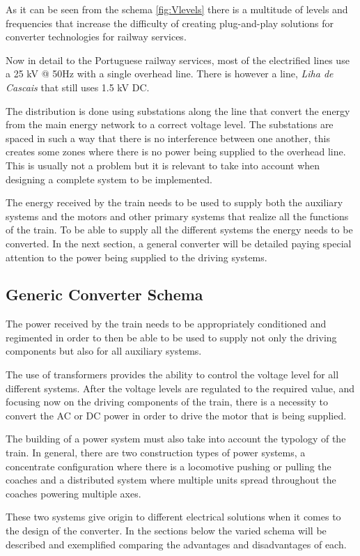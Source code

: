 As it can be seen from the schema \ref{fig:Vlevels} there is a multitude of levels and frequencies that increase the difficulty of creating plug-and-play solutions for converter technologies for railway services.

Now in detail to the Portuguese railway services, most of the electrified lines use a 25 kV @ 50Hz with a single overhead line. There is however a line, \textit{Liha de Cascais} that still uses 1.5 kV DC. 

The distribution is done using substations along the line that convert the energy from the main energy network to a correct voltage level. The substations are spaced in such a way that there is no interference between one another, this creates some zones where there is no power being supplied to the overhead line. This is usually not a problem but it is relevant to take into account when designing a complete system to be implemented.

The energy received by the train needs to be used to supply both the auxiliary systems and the motors and other primary systems that realize all the functions of the train. To be able to supply all the different systems the energy needs to be converted. In the next section, a general converter will be detailed paying special attention to the power being supplied to the driving systems.

\subsection{Generic Converter Schema}
The power received by the train needs to be appropriately conditioned and regimented in order to then be able to be used to supply not only the driving components but also for all auxiliary systems.

The use of transformers provides the ability to control the voltage level for all different systems. After the voltage levels are regulated to the required value, and focusing now on the driving components of the train, there is a necessity to convert the AC or DC power in order to drive the motor that is being supplied.

The building of a power system must also take into account the typology of the train. In general, there are two construction types of power systems, a concentrate configuration where there is a locomotive pushing or pulling the coaches and a distributed system where multiple units spread throughout the coaches powering multiple axes.

These two systems give origin to different electrical solutions when it comes to the design of the converter. In the sections below the varied schema will be described and exemplified comparing the advantages and disadvantages of each.
